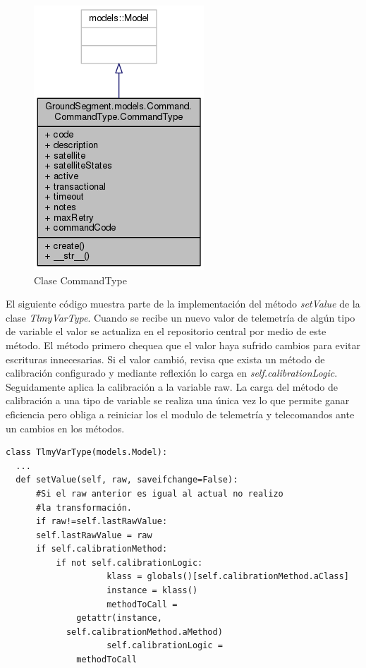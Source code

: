 \documentclass[twoside,twocolumn]{article}
\begin{document}
{{\begin{figure}[!htb]
\begin{minipage}{0.2\textwidth}
        \centering
        \includegraphics[width=0.5\linewidth]{Imagenes/CommandType.png}
        \caption{Clase CommandType}
        \label{fig:prob1_6_1}
    \end{minipage}
\end{figure}

El siguiente código muestra parte de la implementación del método \textit{setValue} de la clase \textit{TlmyVarType}. Cuando se recibe un nuevo valor de telemetría de algún tipo de variable el valor se actualiza en el repositorio central por medio de este método. El método primero chequea que el valor haya sufrido cambios para evitar escrituras innecesarias. Si el valor cambió, revisa que exista un método de calibración configurado y mediante reflexión lo carga en \textit{self.calibrationLogic}. Seguidamente aplica la calibración a la variable raw. La carga del método de calibración a una tipo de variable se realiza una única vez lo que permite ganar eficiencia pero obliga a reiniciar los el modulo de telemetría y telecomandos ante un cambios en los métodos.

\begin{verbatim}
class TlmyVarType(models.Model):
  ...
  def setValue(self, raw, saveifchange=False):
      #Si el raw anterior es igual al actual no realizo
      #la transformación.
      if raw!=self.lastRawValue:
	  self.lastRawValue = raw
	  if self.calibrationMethod: 
	      if not self.calibrationLogic:
                    klass = globals()[self.calibrationMethod.aClass]
                    instance = klass()
                    methodToCall = 
		      getattr(instance, 
			self.calibrationMethod.aMethod)
                    self.calibrationLogic = 
		      methodToCall   
                

\end{verbatim}}}
\end{document}
